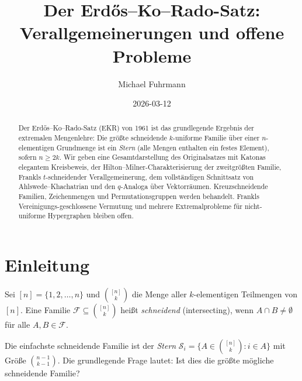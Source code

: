 \documentclass[12pt,a4paper]{amsart}
\theoremstyle{definition}
\theoremstyle{remark}
\begin{document}
\begin{abstract}
Der Erdős--Ko--Rado-Satz (EKR) von 1961 ist das grundlegende Ergebnis der
extremalen Mengenlehre: Die größte schneidende $k$-uniforme Familie über einer
$n$-elementigen Grundmenge ist ein \emph{Stern} (alle Mengen enthalten ein festes
Element), sofern $n \geq 2k$. Wir geben eine Gesamtdarstellung des Originalsatzes
mit Katonas elegantem Kreisbeweis, der Hilton--Milner-Charakterisierung der
zweitgrößten Familie, Frankls $t$-schneidender Verallgemeinerung, dem vollständigen
Schnittsatz von Ahlswede--Khachatrian und den $q$-Analoga über Vektorräumen.
Kreuzschneidende Familien, Zeichenmengen und Permutationsgruppen werden behandelt.
Frankls Vereinigungs-geschlossene Vermutung und mehrere Extremalprobleme für
nicht-uniforme Hypergraphen bleiben offen.
\end{abstract}

\title{Der Erd\H{o}s--Ko--Rado-Satz:\\
Verallgemeinerungen und offene Probleme}

\author{Michael Fuhrmann}
\address{Specialist Mathematics Project, Build 164}
\date{2026-03-12}

\maketitle

\tableofcontents

\section{Einleitung}

Sei $[n] = \{1, 2, \ldots, n\}$ und $\binom{[n]}{k}$ die Menge aller
$k$-elementigen Teilmengen von $[n]$. Eine Familie
$\mathcal{F} \subseteq \binom{[n]}{k}$ heißt \emph{schneidend} (intersecting), wenn
$A \cap B \neq \emptyset$ für alle $A, B \in \mathcal{F}$.

Die einfachste schneidende Familie ist der \emph{Stern}
$\mathcal{S}_i = \{A \in \binom{[n]}{k} : i \in A\}$
mit Größe $\binom{n-1}{k-1}$. Die grundlegende Frage lautet: Ist dies die größte
mögliche schneidende Familie?
\end{document}
